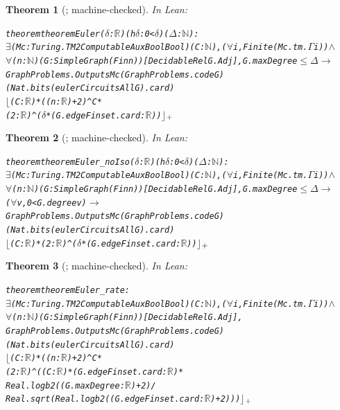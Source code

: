 \documentclass[10pt]{amsart}
\theoremstyle{plain}
\newtheorem{theorem}{Theorem}[section]
\theoremstyle{definition}
\theoremstyle{remark}
\numberwithin{equation}{section}
\begin{document}
\begin{theorem}[; machine-checked]\label{thm:euler}
In Lean:
\begin{alltt}\footnotesize
theorem theoremEuler (\(\delta\) : \(\mathbb{R}\)) (h\(\delta\) : 0 < \(\delta\)) (\(\Delta\) : \(\mathbb{N}\)) :
    \(\exists\) (Mc : Turing.TM2ComputableAux Bool Bool) (C : \(\mathbb{N}\)), (\(\forall\) i, Finite (Mc.tm.\(\Gamma\) i)) \(\wedge\)
      \(\forall\) (n : \(\mathbb{N}\)) (G : SimpleGraph (Fin n)) [DecidableRel G.Adj], G.maxDegree \(\le\) \(\Delta\) \(\to\)
        GraphProblems.Outputs Mc (GraphProblems.code G) (Nat.bits (eulerCircuitsAll G).card)
          \(\lfloor\)(C : \(\mathbb{R}\)) * ((n : \(\mathbb{R}\)) + 2) ^ C *
            (2 : \(\mathbb{R}\)) ^ (\(\delta\) * (G.edgeFinset.card : \(\mathbb{R}\)))\(\rfloor\)\(\sb{+}\)
\end{alltt}
\end{theorem}

\begin{theorem}[; machine-checked]\label{thm:noiso}
In Lean:
\begin{alltt}\footnotesize
theorem theoremEuler_noIso (\(\delta\) : \(\mathbb{R}\)) (h\(\delta\) : 0 < \(\delta\)) (\(\Delta\) : \(\mathbb{N}\)) :
    \(\exists\) (Mc : Turing.TM2ComputableAux Bool Bool) (C : \(\mathbb{N}\)), (\(\forall\) i, Finite (Mc.tm.\(\Gamma\) i)) \(\wedge\)
      \(\forall\) (n : \(\mathbb{N}\)) (G : SimpleGraph (Fin n)) [DecidableRel G.Adj], G.maxDegree \(\le\) \(\Delta\) \(\to\)
        (\(\forall\) v, 0 < G.degree v) \(\to\)
        GraphProblems.Outputs Mc (GraphProblems.code G) (Nat.bits (eulerCircuitsAll G).card)
          \(\lfloor\)(C : \(\mathbb{R}\)) * (2 : \(\mathbb{R}\)) ^ (\(\delta\) * (G.edgeFinset.card : \(\mathbb{R}\)))\(\rfloor\)\(\sb{+}\)
\end{alltt}
\end{theorem}

\begin{theorem}[; machine-checked]\label{thm:rate}
In Lean:
\begin{alltt}\footnotesize
theorem theoremEuler_rate :
    \(\exists\) (Mc : Turing.TM2ComputableAux Bool Bool) (C : \(\mathbb{N}\)), (\(\forall\) i, Finite (Mc.tm.\(\Gamma\) i)) \(\wedge\)
      \(\forall\) (n : \(\mathbb{N}\)) (G : SimpleGraph (Fin n)) [DecidableRel G.Adj],
        GraphProblems.Outputs Mc (GraphProblems.code G) (Nat.bits (eulerCircuitsAll G).card)
          \(\lfloor\)(C : \(\mathbb{R}\)) * ((n : \(\mathbb{R}\)) + 2) ^ C *
            (2 : \(\mathbb{R}\)) ^ ((C : \(\mathbb{R}\)) * (G.edgeFinset.card : \(\mathbb{R}\)) *
              Real.logb 2 ((G.maxDegree : \(\mathbb{R}\)) + 2) /
                Real.sqrt (Real.logb 2 ((G.edgeFinset.card : \(\mathbb{R}\)) + 2)))\(\rfloor\)\(\sb{+}\)
\end{alltt}
\end{theorem}
\end{document}
